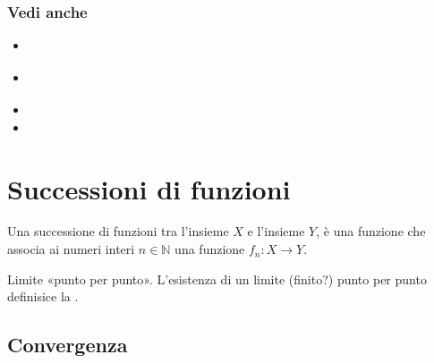 \documentclass[letterpaper,10pt,italian]{jupyterBook}
\begin{document}
\subsubsection*{Vedi anche}
\begin{itemize}
\item {} 
\sphinxAtStartPar
{\hyperref[\detokenize{ch/series:math-hs-sequence-series-numerical-real}]{}}

\item {} 
\sphinxAtStartPar
{\hyperref[\detokenize{ch/series/series-functions-real:math-hs-series-functions-real}]{}}

\item {} 
\sphinxAtStartPar
{}

\item {} 
\sphinxAtStartPar
{}

\end{itemize}


\section{Successioni di funzioni}
\label{\detokenize{ch/series/series-functions-real:successioni-di-funzioni}}\label{\detokenize{ch/series/series-functions-real:math-hs-series-fun-sequences-def}}
\sphinxAtStartPar
{} Una successione di funzioni tra l’insieme \(X\) e l’insieme \(Y\), è una funzione che associa ai numeri interi \(n \in \mathbb{N}\) una funzione \(f_n: X \rightarrow Y\).

\sphinxAtStartPar
{} Limite «punto per punto». L’esistenza di un limite (finito?) punto per punto definisice la {\hyperref[\detokenize{ch/series/series-functions-real:math-hs-series-fun-sequences-convergence-point}]{}}.


\subsection{Convergenza}
\label{\detokenize{ch/series/series-functions-real:convergenza}}\label{\detokenize{ch/series/series-functions-real:math-hs-series-fun-sequences-convergence}}
\end{document}
